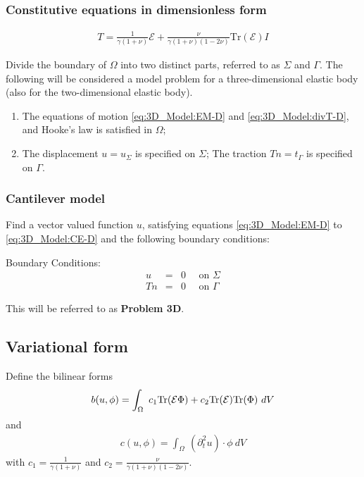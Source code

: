 		\subsubsection*{Constitutive equations in dimensionless form}\label{sssec:3D_Model:ConstitutiveEquationsDimensionless}
			\begin{eqnarray}
				T = \frac{1}{\gamma(1+\nu)} \mathcal{E} + \frac{\nu}{\gamma(1+\nu)(1-2\nu)}\textrm{Tr}(\mathcal{E})I \label{eq:3D_Model:CE-D}
			\end{eqnarray}

		Divide the boundary of $\Omega$ into two distinct parts, referred to as $\Sigma$ and $\Gamma$. The following will be considered a model problem for a three-dimensional elastic body (also for the two-dimensional elastic body).
		\begin{enumerate}
			\item[] The equations of motion \eqref{eq:3D_Model:EM-D} and \eqref{eq:3D_Model:divT-D}, and Hooke's law is satisfied in $\Omega$;
			\item[] The displacement $u = u_\Sigma$ is specified on
				$\Sigma$; The traction $Tn = t_\Gamma$ is specified on
				$\Gamma$.
		\end{enumerate} \label{sym:n}\label{sym:SigmaGamma}

		\subsubsection*{Cantilever model}
			Find a vector valued function $u$, satisfying equations
			\eqref{eq:3D_Model:EM-D} to \eqref{eq:3D_Model:CE-D} and the following boundary
			conditions:

			Boundary Conditions:
			\begin{eqnarray*}
				u & = & 0 \quad \textrm{ on } \Sigma\\
				Tn & = & 0 \quad \textrm{ on } \Gamma
			\end{eqnarray*}

			This will be referred to as \textbf{Problem 3D}.
			
		\subsection*{Variational form}\label{ssec:3D_Model:VariationalForm}
			Define the bilinear forms
			\begin{eqnarray}
				b(u,\phi) = \int_\Omega~c_1\textrm{Tr}({\cal E}\Phi)+ c_2\textrm{Tr}({\cal E})
				\textrm{Tr}(\Phi) ~dV \label{eq:3D_Model:Bilinear}
			\end{eqnarray}\label{sym:b}
			and
			\begin{eqnarray}
				c(u,\phi) = \int_\Omega~ (\partial^2_t u) \cdot \phi~dV \label{eq:3D_Model:Bilinear_c}
			\end{eqnarray}
			with $\displaystyle c_1 = \frac{1}{\gamma(1+\nu)}$ and $\displaystyle c_2 = \frac{\nu}{\gamma(1+\nu)(1-2\nu)}$.

